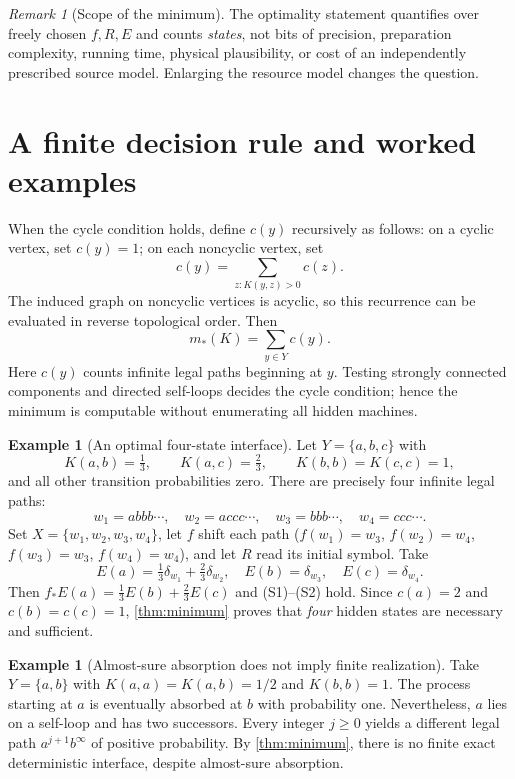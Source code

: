 \documentclass[11pt,letterpaper]{article}
\theoremstyle{definition}\newtheorem{definition}[theorem]{Definition}
\newtheorem{example}[theorem]{Example}
\theoremstyle{remark}\newtheorem{remark}[theorem]{Remark}
\begin{document}
\begin{remark}[Scope of the minimum]
The optimality statement quantifies over freely chosen $f,R,E$ and counts \emph{states}, not bits of precision, preparation complexity, running time, physical plausibility, or cost of an independently prescribed source model. Enlarging the resource model changes the question.
\end{remark}

\section{A finite decision rule and worked examples}
When the cycle condition holds, define $c(y)$ recursively as follows: on a cyclic vertex, set $c(y)=1$; on each noncyclic vertex, set
\begin{equation}\label{eq:recursion}
c(y)=\sum_{z:K(y,z)>0}c(z).
\end{equation}
The induced graph on noncyclic vertices is acyclic, so this recurrence can be evaluated in reverse topological order. Then
\begin{equation}\label{eq:count}
m_*(K)=\sum_{y\in Y}c(y).
\end{equation}
Here $c(y)$ counts infinite legal paths beginning at $y$. Testing strongly connected components and directed self-loops decides the cycle condition; hence the minimum is computable without enumerating all hidden machines.
\begin{example}[An optimal four-state interface]\label{ex:four}
Let $Y=\{a,b,c\}$ with
\[
K(a,b)=\tfrac13,\qquad K(a,c)=\tfrac23,\qquad K(b,b)=K(c,c)=1,
\]
and all other transition probabilities zero. There are precisely four infinite legal paths:
\[
w_1=abbb\cdots,\quad w_2=accc\cdots,\quad w_3=bbb\cdots,\quad w_4=ccc\cdots.
\]
Set $X=\{w_1,w_2,w_3,w_4\}$, let $f$ shift each path ($f(w_1)=w_3$, $f(w_2)=w_4$, $f(w_3)=w_3$, $f(w_4)=w_4$), and let $R$ read its initial symbol. Take
\[
E(a)=\tfrac13\delta_{w_1}+\tfrac23\delta_{w_2},\quad E(b)=\delta_{w_3},\quad E(c)=\delta_{w_4}.
\]
Then $f_*E(a)=\frac13 E(b)+\frac23 E(c)$ and (S1)--(S2) hold. Since $c(a)=2$ and $c(b)=c(c)=1$, \cref{thm:minimum} proves that \emph{four} hidden states are necessary and sufficient.
\end{example}
\begin{example}[Almost-sure absorption does not imply finite realization]\label{ex:geo}
Take $Y=\{a,b\}$ with $K(a,a)=K(a,b)=1/2$ and $K(b,b)=1$. The process starting at $a$ is eventually absorbed at $b$ with probability one. Nevertheless, $a$ lies on a self-loop and has two successors. Every integer $j\ge0$ yields a different legal path $a^{j+1}b^\infty$ of positive probability. By \cref{thm:minimum}, there is no finite exact deterministic interface, despite almost-sure absorption.
\end{example}
\end{document}
